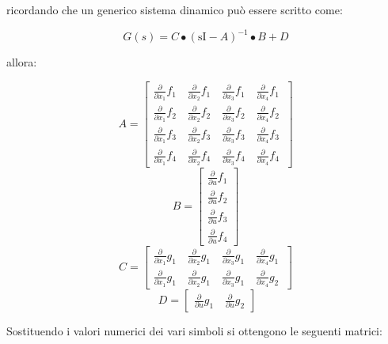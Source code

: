 ricordando che un generico sistema dinamico può essere scritto come:
\begin{center}
	$$
	G\left(s\right)=C\bullet {\left(\mathrm{sI}-A\right)}^{-1} \bullet B+D
	$$
\end{center}
allora:
\begin{center}
	$$
	A=\left\lbrack \begin{array}{cccc}
	\frac{\partial }{\partial x_1 }f_{1\;}  & \frac{\partial }{\partial x_2 }f_{1\;}  & \frac{\partial }{\partial x_3 }f_{1\;}  & \frac{\partial }{\partial x_4 }f_{1\;} \\
	\frac{\partial }{\partial x_1 }f_{2\;}  & \frac{\partial }{\partial x_2 }f_{2\;}  & \frac{\partial }{\partial x_3 }f_{2\;}  & \frac{\partial }{\partial x_4 }f_{2\;} \\
	\frac{\partial }{\partial x_1 }f_3  & \frac{\partial }{\partial x_2 }f_3  & \frac{\partial }{\partial x_3 }f_3  & \frac{\partial }{\partial x_4 }f_3 \\
	\frac{\partial }{\partial x_1 }f_4  & \frac{\partial }{\partial x_2 }f_4  & \frac{\partial }{\partial x_3 }f_4  & \frac{\partial }{\partial x_4 }f_4 
	\end{array}\right\rbrack
	$$
	$$
	B=\left\lbrack \begin{array}{c}
	\frac{\partial }{\partial u}f_1 \\
	\frac{\partial }{\partial u}f_2 \\
	\frac{\partial }{\partial u}f_3 \\
	\frac{\partial }{\partial u}f_4 
	\end{array}\right\rbrack
	$$
	$$
	C=\left\lbrack \begin{array}{cccc}
	\frac{\partial }{\partial x_1 }g_{1\;}  & \frac{\partial }{\partial x_2 }g_{1\;}  & \frac{\partial }{\partial x_3 }g_{1\;}  & \frac{\partial }{\partial x_4 }g_{1\;} \\
	\frac{\partial }{\partial x_1 }g_{1\;}  & \frac{\partial }{\partial x_2 }g_{1\;}  & \frac{\partial }{\partial x_3 }g_{1\;}  & \frac{\partial }{\partial x_4 }g_2 
	\end{array}\right\rbrack
	$$
	$$
	\;D=\left\lbrack \begin{array}{cc}
	\frac{\partial }{\partial u}g_{1\;}  & \frac{\partial }{\partial u}g_2 
	\end{array}\right\rbrack
	$$
\end{center}

Sostituendo i valori numerici dei vari simboli si ottengono le seguenti matrici:

